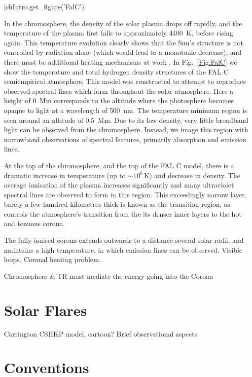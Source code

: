 \py[Intro]|chIntro.get_figure('FalC')|

In the chromosphere, the density of the solar plasma drops off rapidly, and the temperature of the plasma first falls to approximately \SI{4400}{\kelvin}, before rising again.
This temperature evolution clearly shows that the Sun's structure is not controlled by radiation alone (which would lead to a monotonic decrease), and there must be additional heating mechanisms at work \citep{Gurman1992}.
In Fig.~\ref{Fig:FalC} we show the temperature and total hydrogen density structures of the FAL C semiempirical atmosphere.
This model was constructed to attempt to reproduce observed spectral lines which form throughout the solar atmosphere.
Here a height of \SI{0}{\mega\m} corresponds to the altitude where the photosphere becomes opaque to light at a wavelength of \SI{500}{\nano\m}.
The temperature minimum region is seen around an altitude of \SI{0.5}{\mega\metre}.
Due to its low density, very little broadband light can be observed from the chromosphere.
Instead, we image this region with narrowband observations of spectral features, primarily absorption and emission lines.

At the top of the chromosphere, and the top of the FAL C model, there is a dramatic increase in temperature (up to $\sim 10^6\,\si{\kelvin}$) and decrease in density.
The average ionisation of the plasma increases significantly and many ultraviolet spectral lines are observed to form in this region.
This exceedingly narrow layer, barely a few hundred kilometres thick is known as the transition region, as controls the atmosphere's transition from the its denser inner layers to the hot and tenuous corona.

The fully-ionised corona extends outwards to a distance several solar radii, and maintains a high temperature, in which emission lines can be observed.
Visible loops.
Coronal heating problem.

Chromosphere \& TR must mediate the energy going into the Corona

\section{Solar Flares}

Carrington
CSHKP model, cartoon?
Brief observational aspects

\section{Conventions}



